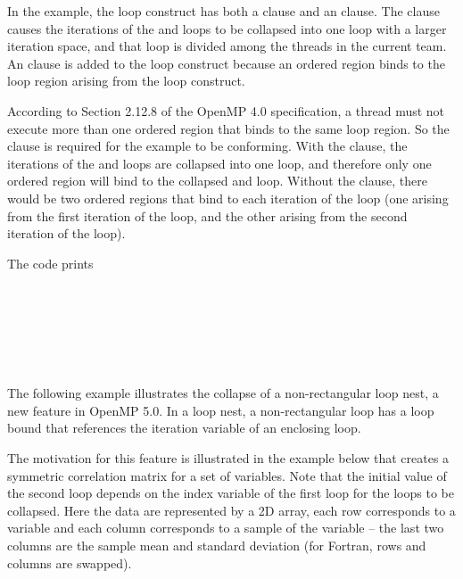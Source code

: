 In the example, the loop construct has both a  clause and an  
clause. The  clause causes the iterations of the  and 
 loops to be collapsed into one loop with a larger iteration space, and 
that loop is divided among the threads in the current team. An  
clause is added to the loop construct because an ordered region binds to the loop 
region arising from the loop construct.

According to Section 2.12.8 of the OpenMP 4.0 specification, 
a thread must not execute more than one ordered region that binds 
to the same loop region. So the  clause is required for the example 
to be conforming. With the  clause, the iterations of the  
and  loops are collapsed into one loop, and therefore only one ordered 
region will bind to the collapsed  and  loop. Without the  
clause, there would be two ordered regions that bind to each iteration of the  
loop (one arising from the first iteration of the  loop, and the other 
arising from the second iteration of the  loop).

The code prints

\\
\\
\\
\\
\\


\clearpage


The following example illustrates the collapse of a non-rectangular loop nest,
a new feature in OpenMP 5.0. In a loop nest, a non-rectangular loop has a
loop bound that references the iteration variable of an enclosing loop.

The motivation for this feature is illustrated
in the example below that creates a symmetric correlation matrix for a set of
variables. Note that the initial value of the second loop depends on the index
variable of the first loop for the loops to be collapsed.
Here the data are represented by a 2D array, each row corresponds to a variable
and each column corresponds to a sample of the variable -- the last two columns
are the sample mean and standard deviation (for Fortran, rows and columns are swapped).


